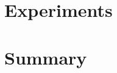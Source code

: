 \documentclass[12pt, twoside, a4paper, openright]{report}
\begin{document}
\chapter{Experiments} \label{ch:experiments}


\chapter{Summary} \label{ch:summary}


\nocite{*}



\begin{appendices}
    
\end{appendices}

\newpage

\listoffigures
\listoftables
\listoflistings
\end{document}
